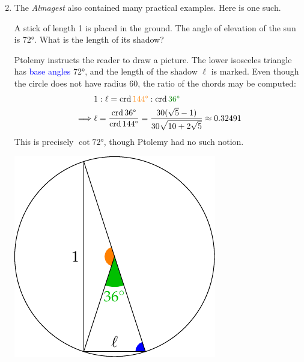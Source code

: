 	\begin{enumerate}\setcounter{enumi}{1}
	  \item The \emph{Almagest} also contained many practical examples. Here is one such.\par
		\begin{minipage}[t]{0.65\linewidth}\vspace{-10pt}
			A stick of length 1 is placed in the ground. The angle of elevation of the sun is \ang{72}. What is the length of its shadow?\smallbreak
		
			Ptolemy instructs the reader to draw a picture. The lower isosceles triangle has \textcolor{blue}{base angles} \ang{72}, and the length of the shadow $\ell$ is marked. Even though the circle does not have radius 60, the ratio of the chords may be computed:
			\begin{align*}
				&1:\ell=\crd \textcolor{orange}{\ang{144}}:\crd \textcolor{Green}{\ang{36}}\\
				\implies &\ell=\frac{\crd \ang{36}}{\crd \ang{144}}=\frac{30(\sqrt 5-1)}{30\sqrt{10+2\sqrt 5}}\approx 0.32491
			\end{align*}
			This is precisely $\cot \ang{72}$, though Ptolemy had no such notion.
		\end{minipage}
		\hfill
		\begin{minipage}[t]{0.34\linewidth}\vspace{-5pt}
			\flushright\includegraphics[scale=0.9]{trig-anglesun}
		\end{minipage}
	\end{enumerate}




